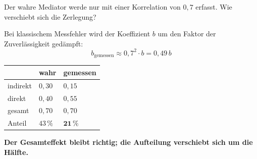 \begin{aufgabe}
Der wahre Mediator werde nur mit einer Korrelation von $0{,}7$ erfasst. Wie verschiebt sich die Zerlegung?

\loesung
{}
Bei klassischem Messfehler wird der Koeffizient $b$ um den Faktor der Zuverlässigkeit gedämpft:
\[ b_{\text{gemessen}} \approx 0{,}7^{2}\cdot b = 0{,}49\,b \]

\begin{center}
{\small
\renewcommand{\arraystretch}{1.46}
\begin{tabular}{@{}P{2.4cm}P{2.0cm}P{2.0cm}@{}}
\toprule
& \textbf{wahr} & \textbf{gemessen}\\
\midrule
indirekt & $0{,}30$ & $0{,}15$\\
direkt & $0{,}40$ & $0{,}55$\\
gesamt & $0{,}70$ & $0{,}70$\\
Anteil & $43\,\%$ & $\mathbf{21\,\%}$\\
\bottomrule
\end{tabular}}
\end{center}

\begin{center}
\begin{minipage}{0.9\textwidth}
\textbf{Der Gesamteffekt bleibt richtig; die Aufteilung verschiebt sich um die Hälfte.}
\end{minipage}
\end{center}

\begin{center}
\begin{minipage}{0.88\textwidth}
\end{minipage}
\end{center}
\end{aufgabe}

